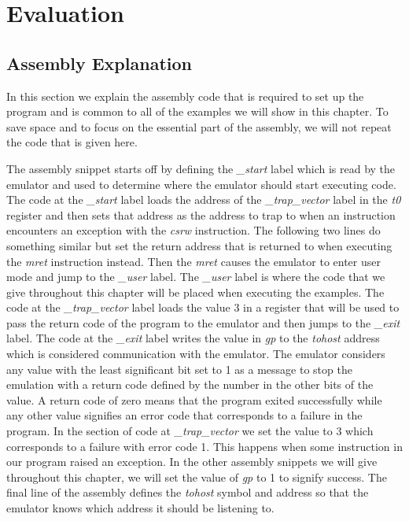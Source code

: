 \chapter{Evaluation}

\section{Assembly Explanation}
In this section we explain the assembly code that is required to set up the program and is common to all of the examples we will show in this chapter.
To save space and to focus on the essential part of the assembly, we will not repeat the code that is given here.

The assembly snippet starts off by defining the \textit{\_start} label which is read by the emulator and used to determine where the emulator should start executing code.
The code at the \textit{\_start} label loads the address of the \textit{\_trap\_vector} label in the \textit{t0} register and then sets that address as the address to trap to when an instruction encounters an exception with the \textit{csrw} instruction.
The following two lines do something similar but set the return address that is returned to when executing the \textit{mret} instruction instead.
Then the \textit{mret} causes the emulator to enter user mode and jump to the \textit{\_user} label.
The \textit{\_user} label is where the code that we give throughout this chapter will be placed when executing the examples.
The code at the \textit{\_trap\_vector} label loads the value 3 in a register that will be used to pass the return code of the program to the emulator and then jumps to the \textit{\_exit} label.
The code at the \textit{\_exit} label writes the value in \textit{gp} to the \textit{tohost} address which is considered communication with the emulator.
The emulator considers any value with the least significant bit set to 1 as a message to stop the emulation with a return code defined by the number in the other bits of the value.
A return code of zero means that the program exited successfully while any other value signifies an error code that corresponds to a failure in the program.
In the section of code at \textit{\_trap\_vector} we set the value to 3 which corresponds to a failure with error code 1.
This happens when some instruction in our program raised an exception.
In the other assembly snippets we will give throughout this chapter, we will set the value of \textit{gp} to 1 to signify success.
The final line of the assembly defines the \textit{tohost} symbol and address so that the emulator knows which address it should be listening to.
